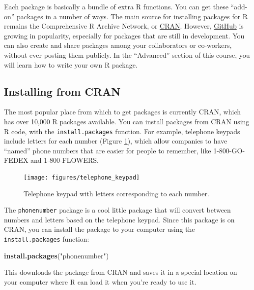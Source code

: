 \documentclass[]{book}
\makeatletter
\newenvironment{Shaded}{\begin{snugshade}}{\end{snugshade}}
\newcommand{\KeywordTok}[1]{\textcolor[rgb]{0.13,0.29,0.53}{\textbf{#1}}}
\newcommand{\StringTok}[1]{\textcolor[rgb]{0.31,0.60,0.02}{#1}}
\newcommand{\NormalTok}[1]{#1}
\newenvironment{kframe}{%
\medskip{}
\setlength{\fboxsep}{.8em}
 \def\at@end@of@kframe{}%
 \ifinner\ifhmode%
  \def\at@end@of@kframe{\end{minipage}}%
  \begin{minipage}{\columnwidth}%
 \fi\fi%
 \def\FrameCommand##1{\hskip\@totalleftmargin \hskip-\fboxsep
 \colorbox{shadecolor}{##1}\hskip-\fboxsep
     \hskip-\linewidth \hskip-\@totalleftmargin \hskip\columnwidth}%
 \MakeFramed {\advance\hsize-\width
   \@totalleftmargin\z@ \linewidth\hsize
   \@setminipage}}%
 {\par\unskip\endMakeFramed%
 \at@end@of@kframe}
\renewenvironment{Shaded}{\begin{kframe}}{\end{kframe}}
\theoremstyle{definition}
\theoremstyle{definition}
\theoremstyle{definition}
\theoremstyle{remark}
\makeatother
\begin{document}
Each package is basically a bundle of extra R functions. You can get
these ``add-on'' packages in a number of ways. The main source for
installing packages for R remains the Comprehensive R Archive Network,
or \href{https://cran.r-project.org}{CRAN}. However,
\href{https://github.com}{GitHub} is growing in popularity, especially
for packages that are still in development. You can also create and
share packages among your collaborators or co-workers, without ever
posting them publicly. In the ``Advanced'' section of this course, you
will learn how to write your own R package.

\subsection{Installing from CRAN}\label{installing-from-cran}

The most popular place from which to get packages is currently CRAN,
which has over 10,000 R packages available. You can install packages
from CRAN using R code, with the \texttt{install.packages} function. For
example, telephone keypads include letters for each number (Figure
\ref{fig:phone-keypad}), which allow companies to have ``named'' phone
numbers that are easier for people to remember, like 1-800-GO-FEDEX and
1-800-FLOWERS.

\begin{figure}

{\centering \texttt{[image: figures/telephone\_keypad]} 

}

\caption{Telephone keypad with letters corresponding to each number.}\label{fig:phone-keypad}
\end{figure}

The \texttt{phonenumber} package is a cool little package that will
convert between numbers and letters based on the telephone keypad. Since
this package is on CRAN, you can install the package to your computer
using the \texttt{install.packages} function:

\begin{Shaded}
\begin{Highlighting}[]
\KeywordTok{install.packages}\NormalTok{(}\StringTok{"phonenumber"}\NormalTok{)}
\end{Highlighting}
\end{Shaded}

This downloads the package from CRAN and saves it in a special location
on your computer where R can load it when you're ready to use it.
\end{document}
